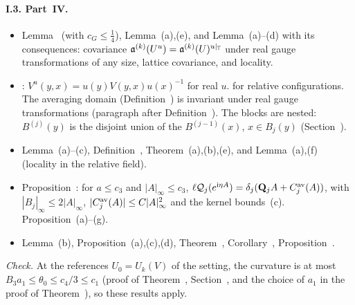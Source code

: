 \paragraph{I.3. Part~IV.}
\begin{itemize}
\item Lemma~ (with $c_G\le\frac14$), Lemma~(a),(e), and Lemma~(a)--(d) with its consequences: covariance $\mathfrak a^{(k)}(U^u)=\mathfrak a^{(k)}(U)^{u|_\mathbb T}$ under real gauge transformations of any size, lattice covariance, and locality.
\item {}: $V^u(y,x)=u(y)V(y,x)u(x)^{-1}$ for real $u$.  for relative configurations. The averaging domain (Definition~) is invariant under real gauge transformations (paragraph after Definition~). The blocks are nested: $B^{(j)}(y)$ is the disjoint union of the $B^{(j-1)}(x)$, $x\in B_j(y)$ (Section~).
\item Lemma~(a)--(c), Definition~, Theorem~(a),(b),(e), and Lemma~(a),(f) (locality in the relative field).
\item Proposition~: for $a\le c_3$ and $|A|_\infty\le c_3$, $\ell\mathcal Q_j(e^{\mathrm i\eta A})=\delta_j(\mathbf Q_jA+C^{\rm av}_j(A))$, with $|B_j|_\infty\le2|A|_\infty$, $|C^{\rm av}_j(A)|\le C|A|^2_\infty$ and the kernel bounds~(c). Proposition~(a)--(g).
\item Lemma~(b), Proposition~(a),(c),(d), Theorem~, Corollary~, Proposition~.
\end{itemize}
\emph{Check.} At the references $U_0=U_k(V)$ of the setting, the curvature is at most $B_3a_1\le\theta_0\le c_4/3\le c_1$ (proof of Theorem~, Section~, and the choice of $a_1$ in the proof of Theorem~), so these results apply.

